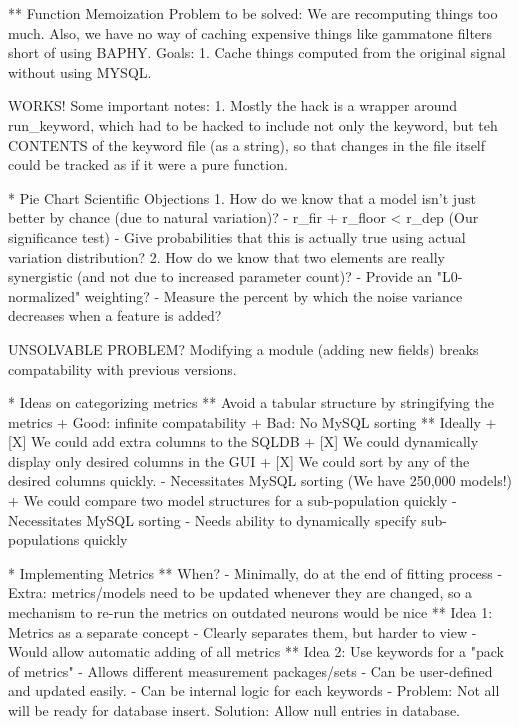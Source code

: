 ** Function Memoization
   Problem to be solved: We are recomputing things too much. Also, we have no way of caching expensive things like gammatone filters short of using BAPHY. 
   Goals: 
   1. Cache things computed from the original signal without using MYSQL. 

   WORKS! Some important notes:
   1. Mostly the hack is a wrapper around run_keyword, which had to be hacked to include not only the keyword, but teh CONTENTS of the keyword file (as a string), so that changes in the file itself could be tracked as if it were a pure function. 


* Pie Chart Scientific Objections
  1. How do we know that a model isn't just better by chance (due to natural variation)?
     - r_fir + r_floor < r_dep  (Our significance test)
     - Give probabilities that this is actually true using actual variation distribution?
  2. How do we know that two elements are really synergistic (and not due to increased parameter count)?
     - Provide an "L0-normalized" weighting?
     - Measure the percent by which the noise variance decreases when a feature is added?


UNSOLVABLE PROBLEM? 
Modifying a module (adding new fields) breaks compatability with previous versions.


* Ideas on categorizing metrics
** Avoid a tabular structure by stringifying the metrics
   + Good: infinite compatability
   + Bad: No MySQL sorting
** Ideally
   + [X] We could add extra columns to the SQLDB
   + [X] We could dynamically display only desired columns in the GUI
   + [X] We could sort by any of the desired columns quickly.
      - Necessitates MySQL sorting (We have 250,000 models!)
   + We could compare two model structures for a sub-population quickly 
     - Necessitates MySQL sorting 
     - Needs ability to dynamically specify sub-populations quickly 

* Implementing Metrics
** When?
   - Minimally, do at the end of fitting process
   - Extra: metrics/models need to be updated whenever they are changed, so a mechanism to re-run the metrics on outdated neurons would be nice
** Idea 1: Metrics as a separate concept
   - Clearly separates them, but harder to view
   - Would allow automatic adding of all metrics
** Idea 2: Use keywords for a "pack of metrics"
   - Allows different measurement packages/sets
   - Can be user-defined and updated easily. 
   - Can be internal logic for each keywords 
   - Problem: Not all will be ready for database insert. Solution: Allow null entries in database. 


